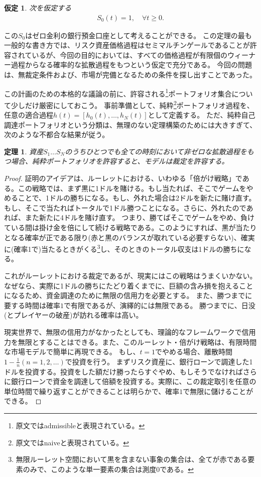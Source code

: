 \documentclass{jsbook}
\theoremstyle{withoutdotendstyle}
\newtheorem{theorem}{定理}[chapter]
\newtheorem{assumption}{仮定}[section]
\numberwithin{theorem}{chapter}%
\begin{document}
\begin{assumption}
  次を仮定する
  \begin{align}
    S_{0}\left(t\right)=1, \quad \forall t\geq 0.
  \end{align}
\end{assumption}
この$S_{0}$はゼロ金利の銀行預金口座として考えることができる。
この定理の最も一般的な書き方では、リスク資産価格過程はセミマルチンゲールであることが許容されているが、今回の目的においては、すべての価格過程が有限個のウィーナー過程からなる確率的な拡散過程をもつという仮定で充分である。
今回の問題は、無裁定条件および、市場が完備となるための条件を探し出すことであった。

この計画のための本格的な議論の前に、許容される\footnote{原文ではadmissibleと表現されている。}ポートフォリオ集合について少しだけ厳密にしておこう。
事前準備として、純粋\footnote{原文ではnaiveと表現されている。}ポートフォリオ過程を、任意の適合過程$h\left(t\right)=\left[ h_{0}\left(t\right), \dots ,h_{N}\left(t\right)\right]$として定義する。
ただ、純粋自己調達ポートフォリオという分類は、無理のない定理構築のためには大きすぎて、次のような不都合な結果が従う。

\begin{theorem}
  資産$S_{1}\dots S_{N}$のうちひとつでも全ての時刻において非ゼロな拡散過程をもつ場合、純粋ポートフォリオを許容すると、モデルは裁定を許容する。
\end{theorem}
\begin{proof}
  証明のアイデアは、ルーレットにおける、いわゆる「倍がけ戦略」である。この戦略では、まず黒に1ドルを賭ける。もし当たれば、そこでゲームをやめることで、1ドルの勝ちになる。もし、外れた場合は2ドルを新たに賭け直す。もし、そこで当たればトータルで1ドル勝つことになる。さらに、外れたのであれば、また新たに4ドルを賭け直す。
  つまり、勝てばそこでゲームをやめ、負けている間は掛け金を倍にして続ける戦略である。このようにすれば、黒が当たりとなる確率が正である限り(赤と黒のバランスが取れている必要すらない)、確実に(確率1で)当たるときがくる\footnote{無限ルーレット空間において黒を含まない事象の集合は、全てが赤である要素のみで、このような単一要素の集合は測度$0$である。}し、そのときのトータル収支は1ドルの勝ちになる。

  これがルーレットにおける裁定であるが、現実にはこの戦略はうまくいかない。なぜなら、実際に1ドルの勝ちにたどり着くまでに、巨額の含み損を抱えることになるため、資金調達のために無限の信用力を必要とする。
  また、勝つまでに要する時間は確率$1$で有限であるが、演繹的には無限である。
  勝つまでに、日没(とプレイヤーの破産)が訪れる確率は高い。

  現実世界で、無限の信用力がなかったとしても、理論的なフレームワークで信用力を無限とすることはできる。また、このルーレット・倍がけ戦略は、有限時間な市場モデルで簡単に再現できる。
  もし、$t=1$でやめる場合、離散時間$1 - \frac{1}{n}(n = 1, 2, \dots)$で投資を行う。
  まずリスク資産に、銀行ローンで調達した1ドルを投資する。投資をした額だけ勝ったらすぐやめ、もしそうでなければさらに銀行ローンで資金を調達して倍額を投資する。実際に、この裁定取引を任意の単位時間で繰り返すことができることは明らかで、確率$1$で無限に儲けることができる。
\end{proof}
\end{document}
